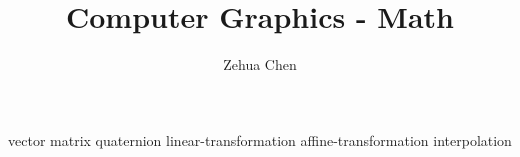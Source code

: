 \documentclass[letterpaper, 11pt]{report}
\title{Computer Graphics - Math}
\author{Zehua Chen}
\begin{document}
  \maketitle
  \tableofcontents

  {vector}
  {matrix}
  {quaternion}
  {linear-transformation}
  {affine-transformation}
  {interpolation}
\end{document}
